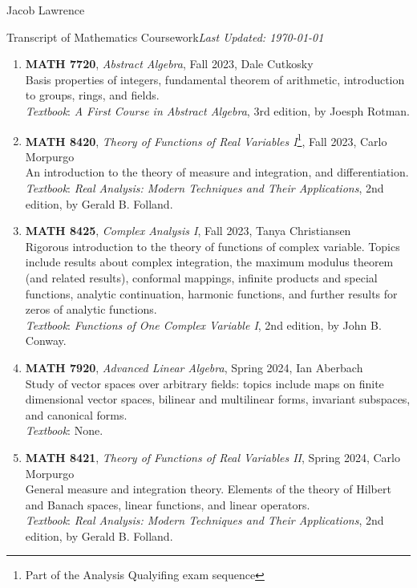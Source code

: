 \documentclass{article}
\begin{document}
\huge Jacob Lawrence

\large Transcript of Mathematics Coursework\hfill \normalsize \textit{Last Updated: \today}

\begin{enumerate}[leftmargin=0in]
    \item[] \textbf{MATH 7720}, \textit{Abstract Algebra}, Fall 2023, Dale Cutkosky \\ 
    Basis properties of integers, fundamental theorem of arithmetic, introduction to groups, rings, and fields.\\
    \textit{Textbook}: \textit{A First Course in Abstract Algebra}, 3rd edition, by Joesph Rotman.  

    \item[] \textbf{MATH 8420}, \textit{Theory of Functions of Real Variables I}\footnote{Part of the Analysis Qualyifing exam sequence\label{Analysis Qual}}, Fall 2023, Carlo Morpurgo\\
    An introduction to the theory of measure and integration, and differentiation.  \\
    \textit{Textbook}: \textit{Real Analysis: Modern Techniques and Their Applications}, 2nd edition, by Gerald B. Folland. 

    \item[] \textbf{MATH 8425}, \textit{Complex Analysis I}, Fall 2023, Tanya Christiansen\\
    Rigorous introduction to the theory of functions of complex variable. Topics include results about complex integration, the maximum modulus theorem (and related results), conformal mappings, infinite products and special functions, analytic continuation, harmonic functions, and further results for zeros of analytic functions. \\
    \textit{Textbook}: \textit{Functions of One Complex Variable I}, 2nd edition, by John B. Conway. 
    
    \item[] \textbf{MATH 7920}, \textit{Advanced Linear Algebra}, Spring 2024, Ian Aberbach\\
    Study of vector spaces over arbitrary fields: topics include maps on finite dimensional vector spaces, bilinear and multilinear forms, invariant subspaces, and canonical forms. \\
    \textit{Textbook}: None.  

    \item[] \textbf{MATH 8421}, \textit{Theory of Functions of Real Variables II}, Spring 2024, Carlo Morpurgo \\
    General measure and integration theory. Elements of the theory of Hilbert and Banach spaces, linear functions, and linear operators. \\
    \textit{Textbook}: \textit{Real Analysis: Modern Techniques and Their Applications}, 2nd edition, by Gerald B. Folland. 


\end{enumerate}
\end{document}
